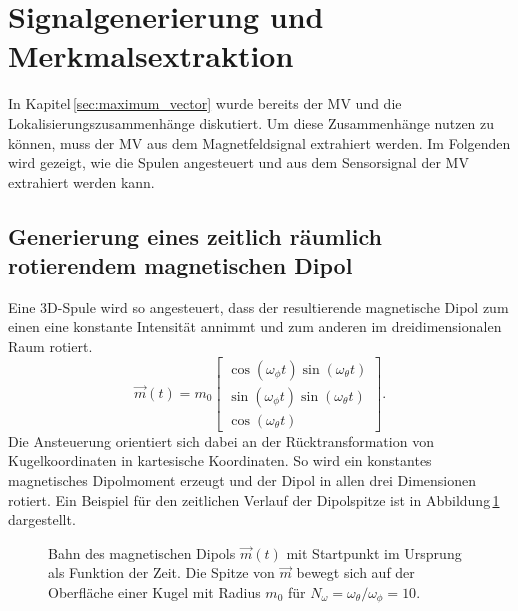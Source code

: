 \section{Signalgenerierung und Merkmalsextraktion}
\label{sec:featureExtract}
In Kapitel\,\ref{sec:maximum_vector} wurde bereits der MV und die Lokalisierungszusammenhänge diskutiert. Um diese Zusammenhänge nutzen zu können, muss der MV aus dem Magnetfeldsignal extrahiert werden. Im Folgenden wird gezeigt, wie die Spulen angesteuert und aus dem Sensorsignal der MV extrahiert werden kann.

\subsection{Generierung eines zeitlich räumlich rotierendem magnetischen Dipol}
Eine 3D-Spule wird so angesteuert, dass der resultierende magnetische Dipol zum einen eine konstante Intensität annimmt und zum anderen im dreidimensionalen Raum rotiert. 
\begin{equation}
\vec{m}(t) = m_0 \left[\begin{array}{c} \cos(\omega_\phi t) \sin(\omega_\theta t)\\ \sin(\omega_\phi t)\sin(\omega_\theta t)\\ \cos(\omega_\theta t) \end{array}\right].
\label{eq:rotDipole}
\end{equation}
Die Ansteuerung orientiert sich dabei an der Rücktransformation von Kugelkoordinaten in kartesische Koordinaten. So wird ein konstantes magnetisches Dipolmoment erzeugt und der Dipol in allen drei Dimensionen rotiert. Ein Beispiel für den zeitlichen Verlauf der Dipolspitze ist in Abbildung\,\ref{fig:DipoleTrack} dargestellt.

    \begin{figure}[htb]
        \centering
        \caption{ Bahn des magnetischen Dipols $\vec m (t)$ mit Startpunkt im Ursprung als Funktion der Zeit. Die Spitze von $\vec m$ bewegt sich auf der Oberfläche einer Kugel mit Radius $m_0$ für $N_\omega=\omega_\theta / \omega_\phi = 10$.}
        \label{fig:DipoleTrack}
    \end{figure}


